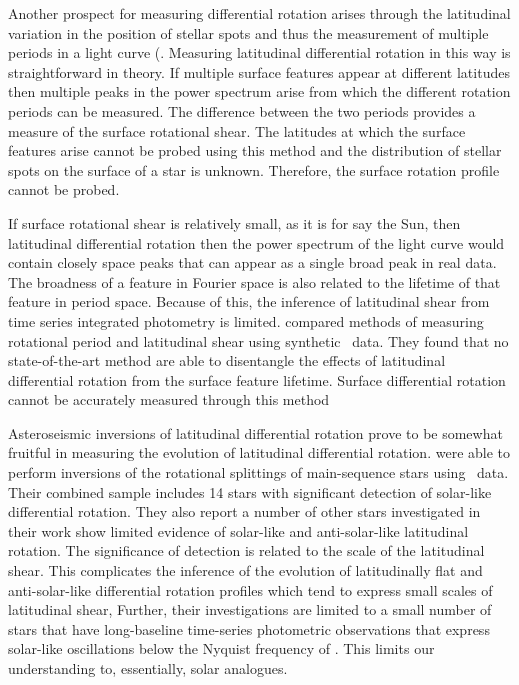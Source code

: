 Another prospect for measuring differential rotation arises through the latitudinal variation in the position of stellar spots and thus the measurement of multiple periods in a light curve (\citep[see, e.g.,][]{walcowicz_rotation_2013, reinhold_rotation_2013}.
Measuring latitudinal differential rotation in this way is straightforward in theory.
If multiple surface features appear at different latitudes then multiple peaks in the power spectrum arise from which the different rotation periods can be measured.
The difference between the two periods provides a measure of the surface rotational shear.
The latitudes at which the surface features arise cannot be probed using this method and the distribution of stellar spots on the surface of a star is unknown.
Therefore, the surface rotation profile cannot be probed.

If surface rotational shear is relatively small, as it is for say the Sun, then latitudinal differential rotation then the power spectrum of the light curve would contain closely space peaks that can appear as a single broad peak in real data.
The broadness of a feature in Fourier space is also related to the lifetime of that feature in period space.
Because of this, the inference of latitudinal shear from time series integrated photometry is limited.
\citet{aigrain_hare_2015} compared methods of measuring rotational period and latitudinal shear using synthetic \kepler\ data.
They found that no state-of-the-art method \citep[e.g., those adopted by ][]{reinhold_rotation_2013, mcquillan_rotation_2014, garcia_rotation_2014} are able to disentangle the effects of latitudinal differential rotation from the surface feature lifetime.
Surface differential rotation cannot be accurately measured through this method

Asteroseismic inversions of latitudinal differential rotation prove to be somewhat fruitful in measuring the evolution of latitudinal differential rotation.
\citet{benomar_asteroseismic_2018, bazot_latitudinal_2019, hall_weakened_2021} were able to perform inversions of the rotational splittings of main-sequence stars using \kepler\ data.
Their combined sample includes 14 stars with significant detection of solar-like differential rotation.
They also report a number of other stars investigated in their work show limited evidence of solar-like and anti-solar-like latitudinal rotation.
The significance of detection is related to the scale of the latitudinal shear.
This complicates the inference of the evolution of latitudinally flat and anti-solar-like differential rotation profiles which tend to express small scales of latitudinal shear,
Further, their investigations are limited to a small number of stars that have long-baseline time-series photometric observations that express solar-like oscillations below the Nyquist frequency of \kepler{}.
This limits our understanding to, essentially, solar analogues.

